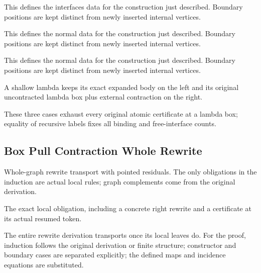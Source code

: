 This defines the interfaces data for the construction just described. Boundary positions are kept distinct from newly inserted internal vertices.
\par{}

This defines the normal data for the construction just described. Boundary positions are kept distinct from newly inserted internal vertices.
\par{}

This defines the normal data for the construction just described. Boundary positions are kept distinct from newly inserted internal vertices.
\par{}

A shallow lambda keeps its exact expanded body on the left and its original uncontracted lambda box plus external contraction on the right.
\par{}

These three cases exhaust every original atomic certificate at a lambda box; equality of recursive labels fixes all binding and free-interface counts.
\par{}

\subsection{Box Pull Contraction Whole Rewrite}
Whole-graph rewrite transport with pointed residuals. The only obligations in the induction are actual local rules; graph complements come from the original derivation.

The exact local obligation, including a concrete right rewrite and a certificate at its actual resumed token.
\par{}

The entire rewrite derivation transports once its local leaves do.
For the proof, induction follows the original derivation or finite structure; constructor and boundary cases are separated explicitly; the defined maps and incidence equations are substituted.
\par{}

